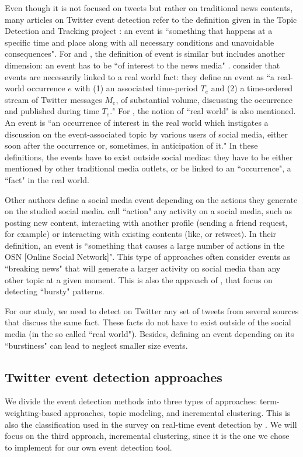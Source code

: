 Even though it is not focused on tweets but rather on traditional news contents, many articles on Twitter event detection refer to the definition given in the Topic Detection and Tracking project \citep{allan_introduction_2002}: an event is ``something that happens at a specific time and place along with all necessary conditions and unavoidable consequences". 
For \citet{aggarwal_event_2012} and \citet{mcminn_building_2013}, the definition of event is similar but includes another dimension: an event has to be ``of interest to the news media" \citep{aggarwal_event_2012}.
\citet{becker_beyond_2011} consider that events are necessarily linked to a real world fact: they define an event as ``a real-world occurrence $e$ with (1) an associated time-period $T_e$ and (2) a time-ordered stream of Twitter messages $M_e$, of substantial volume, discussing the occurrence and published during time $T_e$."  
 For \citet{hasan_survey_2018}, the notion of ``real world" is also mentioned. An event is ``an occurrence of interest in the real world which instigates a discussion on the event-associated topic by various users of social media, either soon after the occurrence or, sometimes, in anticipation of it." 
 In these definitions, the events have to exist outside social medias: they have to be either mentioned by other traditional media outlets, or be linked to an ``occurrence", a ``fact" in the real world.
 
Other authors define a social media event depending on the actions they generate on the studied social media. \citet{panagiotou_detecting_2016} call ``action" any activity on a social media, such as posting new content, interacting with another profile (sending a friend request, for example) or interacting with existing contents (like, or retweet). In their definition, an event is ``something that causes a large number of actions in the OSN [Online Social Network]". This type of approaches often consider events as ``breaking news" that will generate a larger activity on social media than any other topic at a given moment. This is also the approach of \citet{guille_event_2015}, that focus on detecting ``bursty" patterns.

For our study, we need to detect on Twitter any set of tweets from several sources that discuss the same fact. These facts do not have to exist outside of the social media (in the so called ``real world"). Besides, defining an event depending on its ``burstiness" can lead to neglect smaller size events.
		
		\subsection{Twitter event detection approaches}
		We divide the event detection methods into three types of approaches: term-weighting-based approaches, topic modeling, and incremental clustering. This is also the classification used in the survey on real-time event detection by \citet{hasan_survey_2018}. We will focus on the third approach, incremental clustering, since it is the one we chose to implement for our own event detection tool.
		
